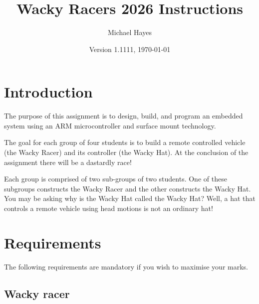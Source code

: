 \documentclass[11pt, a4paper]{article}
\title{Wacky Racers 2026 Instructions}
\author{Michael Hayes}
\date{Version 1.1111, \today}
\begin{document}
\maketitle

\section{Introduction}

The purpose of this assignment is to design, build, and program an
embedded system using an ARM microcontroller and surface mount
technology.

The goal for each group of four students is to build a remote
controlled vehicle (the Wacky Racer) and its controller (the Wacky
Hat).  At the conclusion of the assignment there will be a dastardly race!

Each group is comprised of two sub-groups of two students.  One of
these subgroups constructs the Wacky Racer and the other constructs
the Wacky Hat.  You may be asking why is the Wacky Hat called the
Wacky Hat?  Well, a hat that controls a remote vehicle using head
motions is not an ordinary hat!


\section{Requirements}

The following requirements are mandatory if you wish to maximise your
marks.


\subsection{Wacky racer}
\end{document}

